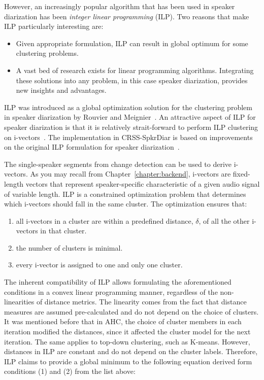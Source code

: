 However, an increasingly popular algorithm that has been used in speaker diarization has been {\it integer linear programming} (ILP). 
Two reasons that make ILP particularly interesting are: 
\begin{itemize}
	\item Given appropriate formulation, ILP can result in global optimum for some clustering problems. 
	\item A vast bed of research exists for linear programming algorithms. Integrating these solutions into any problem, in this case speaker diarization, provides new insights and advantages. 
\end{itemize}

ILP was introduced as a global optimization solution for the clustering problem in speaker diarization by Rouvier and Meignier~\cite{rouvier2012ilp}. 
An attractive aspect of ILP for speaker diarization is that it is relatively strait-forward to perform ILP clustering on i-vectors~\cite{dupuy2012ivectorsILP}. 
The implementation in CRSS-SpkrDiar is based on improvements on the original ILP formulation for speaker diarization~\cite{dupuy2014ILPimprovement}. 

The single-speaker segments from change detection can be used to derive i-vectors. 
As you may recall from Chapter~\ref{chapter:backend}, i-vectors are fixed-length vectors that represent speaker-specific characteristic of a given audio signal of variable length. 
ILP is a constrained optimization problem that determines which i-vectors should fall in the same cluster. 
The optimization ensures that:
\begin{enumerate}
	\item all i-vectors in a cluster are within a predefined distance, $\delta$, of all the other i-vectors in that cluster. 
	\item the number of clusters is minimal. 
	\item every i-vector is assigned to one and only one cluster. 
\end{enumerate}

The inherent compatibility of ILP allows formulating the aforementioned conditions in a convex linear programming manner, regardless of the non-linearities of distance metrics. 
The linearity comes from the fact that distance measures are assumed pre-calculated and do not depend on the choice of clusters. 
It was mentioned before that in AHC, the choice of cluster members in each iteration modified the distances, since it affected the cluster model for the next iteration. 
The same applies to top-down clustering, such as K-means. 
However, distances in ILP are constant and do not depend on the cluster labels. 
Therefore, ILP claims to provide a global minimum to the following equation derived form conditions (1) and (2) from the list above: 

